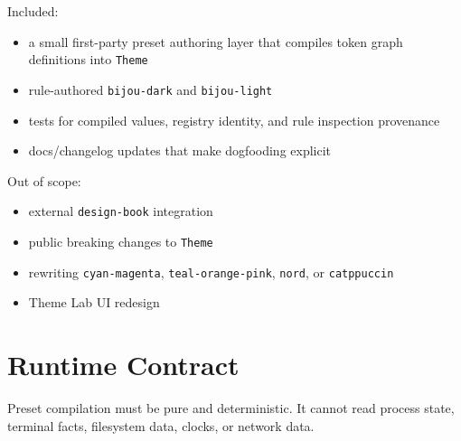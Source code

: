 Included:

\begin{itemize}
\tightlist
\item
  a small first-party preset authoring layer that compiles token graph definitions into \texttt{T\allowbreak{}h\allowbreak{}e\allowbreak{}m\allowbreak{}e}
\item
  rule-authored \texttt{b\allowbreak{}i\allowbreak{}j\allowbreak{}o\allowbreak{}u\allowbreak{}-\allowbreak{}d\allowbreak{}a\allowbreak{}r\allowbreak{}k} and \texttt{b\allowbreak{}i\allowbreak{}j\allowbreak{}o\allowbreak{}u\allowbreak{}-\allowbreak{}l\allowbreak{}i\allowbreak{}g\allowbreak{}h\allowbreak{}t}
\item
  tests for compiled values, registry identity, and rule inspection provenance
\item
  docs/changelog updates that make dogfooding explicit
\end{itemize}

Out of scope:

\begin{itemize}
\tightlist
\item
  external \texttt{d\allowbreak{}e\allowbreak{}s\allowbreak{}i\allowbreak{}g\allowbreak{}n\allowbreak{}-\allowbreak{}b\allowbreak{}o\allowbreak{}o\allowbreak{}k} integration
\item
  public breaking changes to \texttt{T\allowbreak{}h\allowbreak{}e\allowbreak{}m\allowbreak{}e}
\item
  rewriting \texttt{c\allowbreak{}y\allowbreak{}a\allowbreak{}n\allowbreak{}-\allowbreak{}m\allowbreak{}a\allowbreak{}g\allowbreak{}e\allowbreak{}n\allowbreak{}t\allowbreak{}a}, \texttt{t\allowbreak{}e\allowbreak{}a\allowbreak{}l\allowbreak{}-\allowbreak{}o\allowbreak{}r\allowbreak{}a\allowbreak{}n\allowbreak{}g\allowbreak{}e\allowbreak{}-\allowbreak{}p\allowbreak{}i\allowbreak{}n\allowbreak{}k}, \texttt{n\allowbreak{}o\allowbreak{}r\allowbreak{}d}, or \texttt{c\allowbreak{}a\allowbreak{}t\allowbreak{}p\allowbreak{}p\allowbreak{}u\allowbreak{}c\allowbreak{}c\allowbreak{}i\allowbreak{}n}
\item
  Theme Lab UI redesign
\end{itemize}

\section{Runtime Contract}\label{record-185-runtime-contract}

Preset compilation must be pure and deterministic. It cannot read process state, terminal facts, filesystem data, clocks, or network data.

